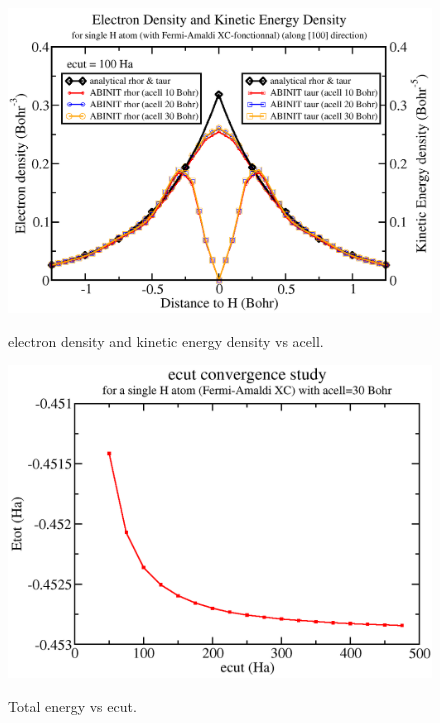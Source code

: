 \documentclass[a4paper,12pt]{report}
\begin{document}
\begin{figure}[!h]
\centering
\begin{minipage}[c]{1.0\textwidth}
\includegraphics[width = \textwidth]{H_DEN_KDEN_line100_acell_crop}
\end{minipage}
\vspace{0.12\textwidth}
\begin{minipage}[c]{0.7\textwidth}
\caption{\small electron density and kinetic energy density vs acell.}
\vspace*{1.0ex}
\label{den_kden_acell}
\end{minipage}
\end{figure}

\begin{figure}[!h]
\centering
\begin{minipage}[c]{0.7\textwidth}
\includegraphics[width = \textwidth]{ecut_fixacell_convergence_crop}
\end{minipage}
\vspace{0.12\textwidth}
\begin{minipage}[c]{0.7\textwidth}
\caption{\small Total energy vs ecut.}
\vspace*{1.0ex}
\label{etot_ecut}
\end{minipage}
\end{figure}
\end{document}
